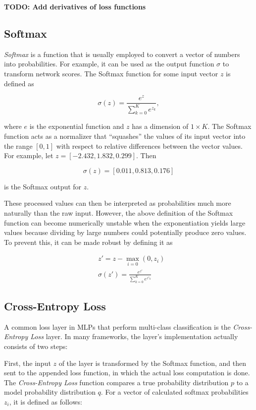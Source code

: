 \textbf{TODO: Add derivatives of loss functions}

	\subsection{Softmax}
\label{subsec:softmax}

\textit{Softmax} is a function that is usually employed to convert a vector of numbers into probabilities. For example, it can be used as the output function $\sigma$ to transform network scores. The Softmax function for some input vector $z$ is defined as

\[\sigma(z) = \frac{e^{z}}{\sum_{k=0}^{K} e^{z_k}},\]

\noindent where $e$ is the exponential function and $z$ has a dimension of $1 \times K$. The Softmax function acts as a normalizer that ``squashes'' the values of its input vector into the range $[0, 1]$ with respect to relative differences between the vector values. For example, let $z = [-2.432, 1.832, 0.299]$. Then 

\[ \sigma(z) = [0.011, 0.813, 0.176] \]

\noindent is the Softmax output for $z$.

These processed values can then be interpreted as probabilities much more naturally than the raw input. However, the above definition of the Softmax function can become numerically unstable when the exponentiation yields large values because dividing by large numbers could potentially produce zero values. To prevent this, it can be made robust by defining it as

\begin {align}
	&z' = z - \max \limits_{i = 0}(0, z_i)\\
	&\sigma(z') = \frac{e^{z'}}{\sum_{k=0}^{K} e^{z'_{{k}}}}
\end {align}


		\subsection{Cross-Entropy Loss}
\label{subsec:cross_ent}

A common loss layer in MLPs that perform multi-class classification is the \textit{Cross-Entropy Loss} layer. In many frameworks, the layer's implementation actually consists of two steps:

First, the input $z$ of the layer is transformed by the Softmax function, and then sent to the appended loss function, in which the actual loss computation is done. The \textit{Cross-Entropy Loss} function compares a true probability distribution $p$ to a model probability distribution $q$. For a vector of calculated softmax probabilities $z_i$, it is defined as follows:

